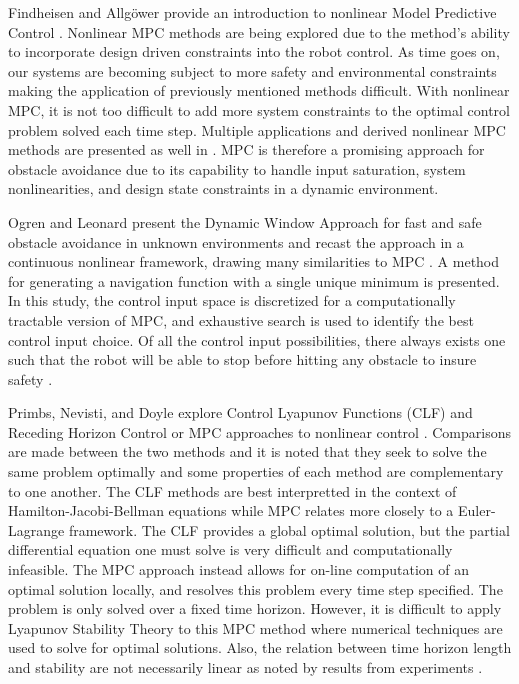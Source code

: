 \documentclass[12pt,onecolumn]{report}
\begin{document}
Findheisen and Allg{\"o}wer provide an introduction to nonlinear Model Predictive Control \cite{Allgower&Findeisen2002}. Nonlinear MPC methods are being explored due to the method's ability to incorporate design driven constraints into the robot control. As time goes on, our systems are becoming subject to more safety and environmental constraints making the application of previously mentioned methods difficult. With nonlinear MPC, it is not too difficult to add more system constraints to the optimal control problem solved each time step. Multiple applications and derived nonlinear MPC methods are presented as well in \cite{Allgower&Findeisen2002}. MPC is therefore a promising approach for obstacle avoidance due to its capability to handle input saturation, system nonlinearities, and design state constraints in a dynamic environment.

Ogren and Leonard present the Dynamic Window Approach for fast and safe obstacle avoidance in unknown environments and recast the approach in a continuous nonlinear framework, drawing many similarities to MPC \cite{Ogren&Leonard2005}. A method for generating a navigation function with a single unique minimum is presented. In this study, the control input space is discretized for a computationally tractable version of MPC, and exhaustive search is used to identify the best control input choice. Of all the control input possibilities, there always exists one such that the robot will be able to stop before hitting any obstacle to insure safety \cite{Ogren&Leonard2005}.

Primbs, Nevisti, and Doyle explore Control Lyapunov Functions (CLF) and Receding Horizon Control or MPC approaches to nonlinear control \cite{Primbs&Nevistic1999}. Comparisons are made between the two methods and it is noted that they seek to solve the same problem optimally and some properties of each method are complementary to one another. The CLF methods are best interpretted in the context of Hamilton-Jacobi-Bellman equations while MPC relates more closely to a Euler-Lagrange framework. The CLF provides a global optimal solution, but the partial differential equation one must solve is very difficult and computationally infeasible. The MPC approach instead allows for on-line computation of an optimal solution locally, and resolves this problem every time step specified. The problem is only solved over a fixed time horizon. However, it is difficult to apply Lyapunov Stability Theory to this MPC method where numerical techniques are used to solve for optimal solutions. Also, the relation between time horizon length and stability are not necessarily linear as noted by results from experiments \cite{Primbs&Nevistic1999}. 
\end{document}
